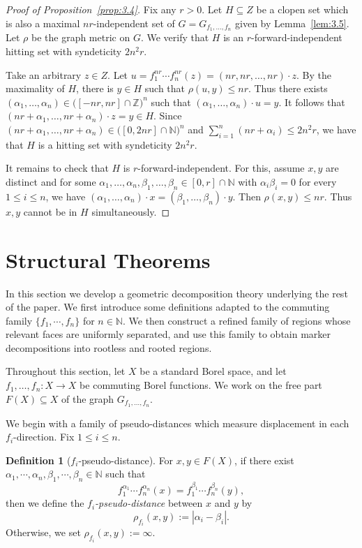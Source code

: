 \documentclass[11pt, reqno, a4paper]{amsart}
\theoremstyle{definition}
\newtheorem{definition}[theorem]{Definition}
\theoremstyle{plain}
\begin{document}
\begin{proof}[Proof of Proposition~\ref{prop:3.4}] Fix any $r>0$. Let $H\subseteq Z$ be a clopen set which is also a maximal $nr$-independent set of $G=G_{f_1,\dots, f_n}$ given by Lemma~\ref{lem:3.5}. Let $\rho$ be the graph metric on $G$. We verify that $H$ is an $r$-forward-independent hitting set with syndeticity $2n^2r$. 

Take an arbitrary $z\in Z$. Let $u=f_1^{nr}\cdots f_n^{nr}(z)=(nr, nr,\dots, nr)\cdot z$. By the maximality of $H$, there is $y\in H$ such that $\rho(u,y)\leq nr$. Thus there exists $(\alpha_1, \dots, \alpha_n)\in \big([-nr, nr]\cap \mathbb{Z}\big)^n$ such that $(\alpha_1,\dots, \alpha_n)\cdot u=y$. It follows that $(nr+\alpha_1,\dots, nr+\alpha_n)\cdot z=y\in H$. Since $(nr+\alpha_1,\dots, nr+\alpha_n)\in \big([0,2nr]\cap \mathbb{N}\big)^n$ and $\sum_{i=1}^n (nr+\alpha_i)\leq 2n^2r$, we have that $H$ is a hitting set with syndeticity $2n^2r$.

It remains to check that $H$ is $r$-forward-independent. For this, assume $x, y$ are distinct and for some $\alpha_1,\dots, \alpha_n, \beta_1,\dots, \beta_n\in [0,r]\cap\mathbb{N}$ with $\alpha_i\beta_i=0$ for every $1\leq i\leq n$, we have $(\alpha_1,\dots, \alpha_n)\cdot x=(\beta_1,\dots, \beta_n)\cdot y$. Then $\rho(x,y)\leq nr$. Thus $x, y$ cannot be in $H$ simultaneously. 
\end{proof}

\section{Structural Theorems}

In this section we develop a geometric decomposition theory underlying the rest of the paper.
We first introduce some definitions adapted to the commuting family $\{f_1,\cdots,f_n\}$ for $n\in \mathbb{N}$.
We then construct a refined family of regions whose relevant faces are uniformly separated, and use this family to obtain marker decompositions into rootless and rooted regions.

Throughout this section, let $X$ be a standard Borel space, and let
$f_1,\ldots,f_n:X\to X$
be commuting Borel functions. We work on the free part
$F(X)\subseteq X$
of the graph $G_{f_1,\ldots,f_n}$.

We begin with a family of pseudo-distances which measure displacement in each  $f_i$-direction. Fix $1\leq i\leq n$.

\begin{definition}[$f_i$-pseudo-distance]\label{def:fi-pseudo-dist}
For $x,y\in F(X)$, if there exist $\alpha_1,\cdots , \alpha_n, \beta_1,\cdots , \beta_n\in\mathbb N$ such that
$$
f_1^{\alpha_1} \cdots  f_n^{\alpha_n}(x)=f_1^{\beta_1} \cdots f_n^{\beta_n}(y),
$$
then we define the \emph{$f_i$-pseudo-distance} between $x$ and $y$ by
$$
\rho_{f_i}(x,y):=|\alpha_i-\beta_i|.
$$
Otherwise, we set
$\rho_{f_i}(x,y):=\infty.$

\end{definition}
\end{document}
